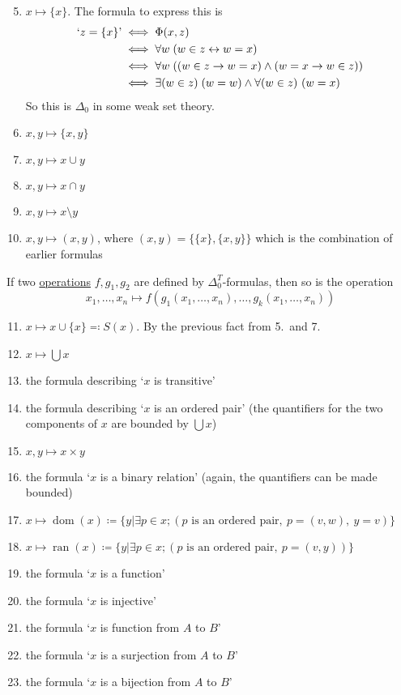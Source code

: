\documentclass{article}
\newcommand{\1}{\mathbbm{1}}
\DeclareMathOperator{\dom}{dom}
\DeclareMathOperator{\ran}{ran}
\begin{document}
\begin{enumerate}
  \setcounter{enumi}{4}
  \item $x \mapsto \{x\}$. The formula to express this is
    \begin{align*}
      `z = \{x\}\text{'} &\iff \Phi(x,z) \\
                  &\iff \forall w \; (w \in z \leftrightarrow w = x) \\
                  &\iff \forall w \; ((w \in z \rightarrow w = x) \land (w = x \rightarrow w \in z)) \\
                  &\iff \exists (w \in z) \; (w = w) \land \forall (w \in z) \ (w = x)
    \end{align*}
    So this is $\Delta_0$ in some weak set theory.
  \item $x,y \mapsto \{x,y\}$
  \item $x,y \mapsto x \cup y$
  \item $x,y \mapsto x \cap y$
  \item $x,y \mapsto x \setminus y$
  \item $x,y \mapsto (x,y)$, where $(x,y) = \{\{x\},\{x,y\}\}$ which is the combination of earlier formulas
\end{enumerate}
If two \hyperlink{def:operation}{operations} $f, g_1, g_2$ are defined by $\Delta_0^T$-formulas, then so is the operation
\begin{equation*}
  x_1, \dotsc, x_n \mapsto f(g_1(x_1, \dotsc, x_n), \dotsc, g_k(x_1, \dotsc, x_n))
\end{equation*}
\begin{enumerate}
  \setcounter{enumi}{10}
  \item $x \mapsto x \cup \{x\} \eqqcolon S(x)$.
    By the previous fact from 5.\ and 7.
  \item $x \mapsto \bigcup x$
  \item the formula describing `$x$ is transitive'
  \item the formula describing `$x$ is an ordered pair' (the quantifiers for the two components of $x$ are bounded by $\bigcup x$)
  \item $x,y \mapsto x \times y$
  \item the formula `$x$ is a binary relation' (again, the quantifiers can be made bounded)
  \item $x \mapsto \dom(x) \coloneqq \{y | \exists p \in x; (p\text{ is an ordered pair},\ p = (v,w),\ y=v)\}$
  \item $x \mapsto \ran(x) \coloneqq \{y | \exists p \in x; (p\text{ is an ordered pair},\ p = (v,y))\}$
  \item the formula `$x$ is a function'
  \item the formula `$x$ is injective'
  \item the formula `$x$ is function from $A$ to $B$'
  \item the formula `$x$ is a surjection from $A$ to $B$'
  \item the formula `$x$ is a bijection from $A$ to $B$'
\end{enumerate}
\end{document}
